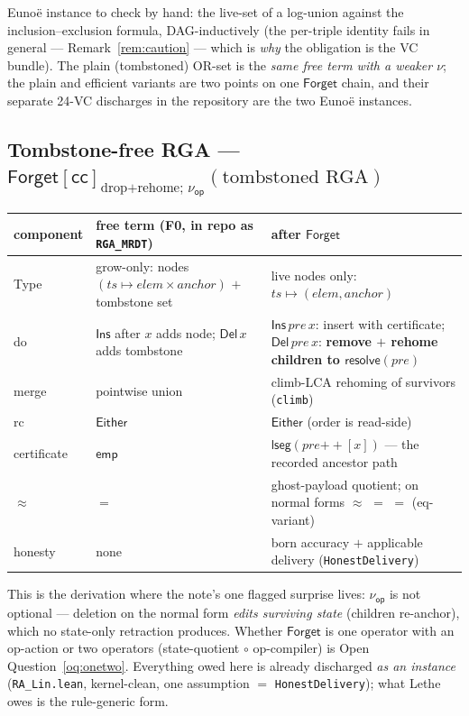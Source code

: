 \documentclass[11pt]{article}
\newcommand{\lean}[1]{\texttt{#1}}
\newcommand{\eqobs}{\approx}
\newcommand{\Forget}{\mathsf{Forget}}
\newcommand{\emp}{\mathsf{emp}}
\newcommand{\lseg}{\mathsf{lseg}}
\newcommand{\Either}{\mathsf{Either}}
\newcommand{\nuop}{\nu_{\mathsf{op}}}
\newcommand{\ts}{\mathit{ts}}
\newcommand{\cc}{\mathsf{cc}}
\begin{document}
Euno\"e instance to check by hand: the live-set of a log-union against the
inclusion--exclusion formula, DAG-inductively (the per-triple identity
fails in general --- Remark~\ref{rem:caution} --- which is \emph{why} the
obligation is the VC bundle). The plain (tombstoned) OR-set is the
\emph{same free term with a weaker $\nu$}; the plain and efficient
variants are two points on one $\Forget$ chain, and their separate 24-VC
discharges in the repository are the two Euno\"e instances.

\subsection{Tombstone-free RGA --- $\Forget[\cc]_{\text{drop{+}rehome};\,\nuop}(\text{tombstoned RGA})$\quad[F3]}
\label{sec:rga-derivation}

\begin{center}
\small
\begin{tabular}{@{}lp{2.5in}p{2.6in}@{}}
\toprule
component & free term (F0, in repo as \lean{RGA\_MRDT}) & after $\Forget$ \\
\midrule
Type & grow-only: nodes $(\ts \mapsto \mathit{elem} \times
       \mathit{anchor})$ $+$ tombstone set
     & live nodes only: $\ts \mapsto (\mathit{elem}, \mathit{anchor})$ \\
do & $\mathsf{Ins}$ after $x$ adds node; $\mathsf{Del}\,x$ adds tombstone
   & $\mathsf{Ins}\,\mathit{pre}\,x$: insert with certificate;
     $\mathsf{Del}\,\mathit{pre}\,x$: \textbf{remove $+$ rehome children
     to $\mathsf{resolve}(\mathit{pre})$} \\
merge & pointwise union
      & climb-LCA rehoming of survivors (\lean{climb}) \\
rc & $\Either$ & $\Either$ \quad(order is read-side) \\
certificate & $\emp$
  & $\lseg(\mathit{pre} \mathbin{+\!\!+} [x])$ --- the recorded ancestor
    path \\
$\eqobs$ & $=$
  & ghost-payload quotient; on normal forms $\eqobs$ $=$ $=$
    (eq-variant) \\
honesty & none
  & born accuracy $+$ applicable delivery (\lean{HonestDelivery}) \\
\bottomrule
\end{tabular}
\end{center}

This is the derivation where the note's one flagged surprise lives:
$\nuop$ is not optional --- deletion on the normal form \emph{edits
surviving state} (children re-anchor), which no state-only retraction
produces. Whether $\Forget$ is one operator with an op-action or two
operators (state-quotient $\circ$ op-compiler) is Open
Question~\ref{oq:onetwo}. Everything owed here is already discharged
\emph{as an instance} (\lean{RA\_Lin.lean}, kernel-clean, one assumption
$=$ \lean{HonestDelivery}); what Lethe owes is the rule-generic form.
\end{document}
